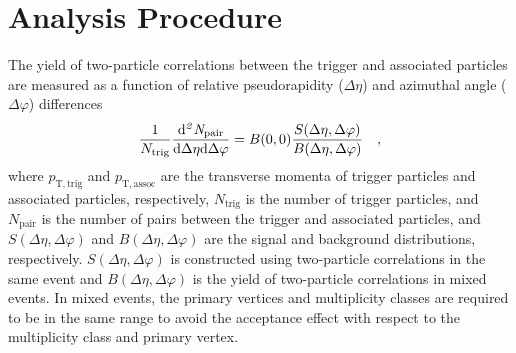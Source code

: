 \section{Analysis Procedure}
\label{sec:ana}

The yield of two-particle correlations between the trigger and associated particles are measured as a function of relative pseudorapidity ($\Delta\eta$) and azimuthal angle ($\Delta\varphi$) differences
\begin{eqnarray}
\frac{1}{N_{\rm{trig}}} \frac{ \rm{d}\it{}^{2} N_{\rm{pair}} }{ \rm{d} \Delta\eta \rm{d}\Delta\varphi} = B(0, 0)\frac{S(\Delta\eta, \Delta\varphi)}{B(\Delta\eta, \Delta\varphi)}\quad,
\end{eqnarray}
where  $p_{\mathrm{T, trig}}$ and $p_{\mathrm{T, assoc}}$ are the transverse momenta of  trigger particles and associated particles, respectively, $N_\mathrm{trig}$ is the number of trigger particles, and $N_\mathrm{pair}$ is the number of pairs between the trigger and associated particles, and $S (\Delta\eta, \Delta\varphi)$ and $B (\Delta\eta, \Delta\varphi)$ are the signal and background distributions, respectively. $S (\Delta\eta, \Delta\varphi)$ is constructed using two-particle correlations in the same event and $B(\Delta\eta, \Delta\varphi)$ is the yield of two-particle correlations in mixed events. In mixed events, the primary vertices and multiplicity classes are required to be in the same range to avoid the acceptance effect with respect to the multiplicity class and primary vertex.

